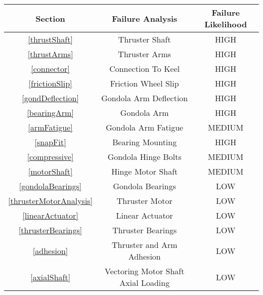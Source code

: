 \documentclass[../main.tex]{subfiles}
\begin{document}
\begin{center}
	\begin{tabular}{|c|c|c|}
	\hline
	\textbf{Section} &\textbf{Failure Analysis} & \textbf{Failure Likelihood} \\
	\hline
	\ref{thrustShaft} & Thruster Shaft & \cellcolor{black}\color{white}HIGH \\
	\hline
	\ref{thrustArms} & Thruster Arms & \cellcolor{black}\color{white}HIGH \\
	\hline
	\ref{connector} & Connection To Keel & \cellcolor{black}\color{white}HIGH \\
	\hline
	\ref{frictionSlip} & Friction Wheel Slip & \cellcolor{black}\color{white}HIGH \\
	\hline
	\ref{gondDeflection} & Gondola Arm Deflection & \cellcolor{black}\color{white}HIGH \\
	\hline
	\ref{bearingArm} & Gondola Arm & \cellcolor{black}\color{white}HIGH \\
	\hline
	\ref{armFatigue} & Gondola Arm Fatigue & \cellcolor{gray}MEDIUM \\
	\hline
	\ref{snapFit} & Bearing Mounting & \cellcolor{black}\color{white}HIGH \\
	\hline
	\ref{compressive} & Gondola Hinge Bolts & \cellcolor{gray}MEDIUM \\
	\hline
	\ref{motorShaft} & Hinge Motor Shaft & \cellcolor{gray}MEDIUM \\
	\hline
	\ref{gondolaBearings} & Gondola Bearings & LOW \\
	\hline
	\ref{thrusterMotorAnalysis} & Thruster Motor & LOW \\
	\hline
	\ref{linearActuator} & Linear Actuator & LOW \\
	\hline
	\ref{thrusterBearings} & Thruster Bearings & LOW \\
	\hline
	\ref{adhesion} & Thruster and Arm Adhesion & LOW \\
	\hline
	\ref{axialShaft} & Vectoring Motor Shaft Axial Loading & LOW \\
	\hline
	\end{tabular}
\end{center}
\end{document}
